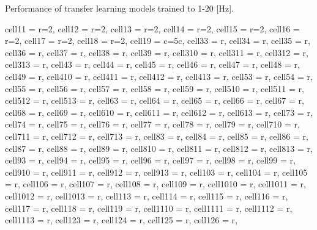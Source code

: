 \documentclass[journal]{IEEEtran}
\begin{document}
\begin{table}
\caption{Performance of transfer learning models trained to 1-20 [Hz].}
\centering
\begin{adjustbox}{width=\textwidth}
\begin{tblr}{
  cell{1}{1} = {r=2}{},
  cell{1}{2} = {r=2}{},
  cell{1}{3} = {r=2}{},
  cell{1}{4} = {r=2}{},
  cell{1}{5} = {r=2}{},
  cell{1}{6} = {r=2}{},
  cell{1}{7} = {r=2}{},
  cell{1}{8} = {r=2}{},
  cell{1}{9} = {c=5}{c},
  cell{3}{3} = {r},
  cell{3}{4} = {r},
  cell{3}{5} = {r},
  cell{3}{6} = {r},
  cell{3}{7} = {r},
  cell{3}{8} = {r},
  cell{3}{9} = {r},
  cell{3}{10} = {r},
  cell{3}{11} = {r},
  cell{3}{12} = {r},
  cell{3}{13} = {r},
  cell{4}{3} = {r},
  cell{4}{4} = {r},
  cell{4}{5} = {r},
  cell{4}{6} = {r},
  cell{4}{7} = {r},
  cell{4}{8} = {r},
  cell{4}{9} = {r},
  cell{4}{10} = {r},
  cell{4}{11} = {r},
  cell{4}{12} = {r},
  cell{4}{13} = {r},
  cell{5}{3} = {r},
  cell{5}{4} = {r},
  cell{5}{5} = {r},
  cell{5}{6} = {r},
  cell{5}{7} = {r},
  cell{5}{8} = {r},
  cell{5}{9} = {r},
  cell{5}{10} = {r},
  cell{5}{11} = {r},
  cell{5}{12} = {r},
  cell{5}{13} = {r},
  cell{6}{3} = {r},
  cell{6}{4} = {r},
  cell{6}{5} = {r},
  cell{6}{6} = {r},
  cell{6}{7} = {r},
  cell{6}{8} = {r},
  cell{6}{9} = {r},
  cell{6}{10} = {r},
  cell{6}{11} = {r},
  cell{6}{12} = {r},
  cell{6}{13} = {r},
  cell{7}{3} = {r},
  cell{7}{4} = {r},
  cell{7}{5} = {r},
  cell{7}{6} = {r},
  cell{7}{7} = {r},
  cell{7}{8} = {r},
  cell{7}{9} = {r},
  cell{7}{10} = {r},
  cell{7}{11} = {r},
  cell{7}{12} = {r},
  cell{7}{13} = {r},
  cell{8}{3} = {r},
  cell{8}{4} = {r},
  cell{8}{5} = {r},
  cell{8}{6} = {r},
  cell{8}{7} = {r},
  cell{8}{8} = {r},
  cell{8}{9} = {r},
  cell{8}{10} = {r},
  cell{8}{11} = {r},
  cell{8}{12} = {r},
  cell{8}{13} = {r},
  cell{9}{3} = {r},
  cell{9}{4} = {r},
  cell{9}{5} = {r},
  cell{9}{6} = {r},
  cell{9}{7} = {r},
  cell{9}{8} = {r},
  cell{9}{9} = {r},
  cell{9}{10} = {r},
  cell{9}{11} = {r},
  cell{9}{12} = {r},
  cell{9}{13} = {r},
  cell{10}{3} = {r},
  cell{10}{4} = {r},
  cell{10}{5} = {r},
  cell{10}{6} = {r},
  cell{10}{7} = {r},
  cell{10}{8} = {r},
  cell{10}{9} = {r},
  cell{10}{10} = {r},
  cell{10}{11} = {r},
  cell{10}{12} = {r},
  cell{10}{13} = {r},
  cell{11}{3} = {r},
  cell{11}{4} = {r},
  cell{11}{5} = {r},
  cell{11}{6} = {r},
  cell{11}{7} = {r},
  cell{11}{8} = {r},
  cell{11}{9} = {r},
  cell{11}{10} = {r},
  cell{11}{11} = {r},
  cell{11}{12} = {r},
  cell{11}{13} = {r},
  cell{12}{3} = {r},
  cell{12}{4} = {r},
  cell{12}{5} = {r},
  cell{12}{6} = {r},
}
\end{tblr}
\end{adjustbox}
\end{table}
\end{document}
